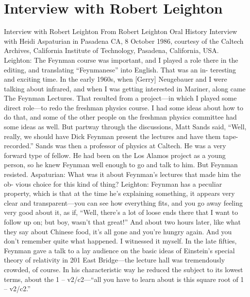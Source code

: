 \documentclass[10pt,oneside]{article}
\begin{document}
\section*{Interview with Robert Leighton}
\label{tips-sec-7-interview-with-robert-leighton}
Interview with Robert Leighton From Robert Leighton Oral History Interview with Heidi Aspaturian in Pasadena CA, 8 October 1986, courtesy of the Caltech Archives, California Institute of Technology, Pasadena, California, USA. Leighton: The Feynman course was important, and I played a role there in the editing, and translating “Feynmanese” into English. That was an in- teresting and exciting time. In the early 1960s, when [Gerry] Neugebauer and I were talking about infrared, and when I was getting interested in Mariner, along came The Feynman Lectures. That resulted from a project---in which I played some direct role---to redo the freshman physics course. I had some ideas about how to do that, and some of the other people on the freshman physics committee had some ideas as well. But partway through the discussions, Matt Sands said, “Well, really, we should have Dick Feynman present the lectures and have them tape-recorded.” Sands was then a professor of physics at Caltech. He was a very forward type of fellow. He had been on the Los Alamos project as a young person, so he knew Feynman well enough to go and talk to him. But Feynman resisted. Aspaturian: What was it about Feynman’s lectures that made him the ob- vious choice for this kind of thing? Leighton: Feynman has a peculiar property, which is that at the time he’s explaining something, it appears very clear and transparent---you can see how everything fits, and you go away feeling very good about it, as if, “Well, there’s a lot of loose ends there that I want to follow up on; but boy, wasn’t that great!” And about two hours later, like what they say about Chinese food, it’s all gone and you’re hungry again. And you don’t remember quite what happened. I witnessed it myself. In the late fifties, Feynman gave a talk to a lay audience on the basic ideas of Einstein’s special theory of relativity in 201 East Bridge---the lecture hall was tremendously crowded, of course. In his characteristic way he reduced the subject to its lowest terms, about the 1 – v2/c2---“all you have to learn about is this square root of 1 – v2/c2.”\par
\end{document}
